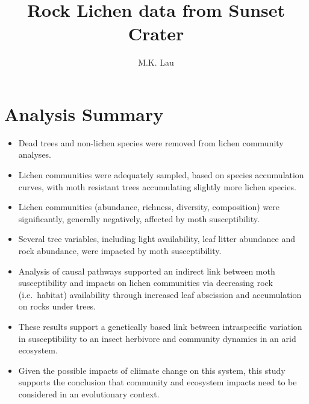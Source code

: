 \documentclass[]{article}
\title{Rock Lichen data from Sunset Crater}
\author{M.K. Lau}
\date{}
\providecommand{\tightlist}{%
  \setlength{\itemsep}{0pt}\setlength{\parskip}{0pt}}
\begin{document}
\maketitle

\section{Analysis Summary}\label{analysis-summary}

\begin{itemize}
\tightlist
\item
  Dead trees and non-lichen species were removed from lichen community
  analyses.
\item
  Lichen communities were adequately sampled, based on species
  accumulation curves, with moth resistant trees accumulating slightly
  more lichen species.
\item
  Lichen communities (abundance, richness, diversity, composition) were
  significantly, generally negatively, affected by moth susceptibility.
\item
  Several tree variables, including light availability, leaf litter
  abundance and rock abundance, were impacted by moth susceptibility.
\item
  Analysis of causal pathways supported an indirect link between moth
  susceptibility and impacts on lichen communities via decreasing rock
  (i.e.~habitat) availability through increased leaf abscission and
  accumulation on rocks under trees.
\item
  These results support a genetically based link between intraspecific
  variation in susceptibility to an insect herbivore and community
  dynamics in an arid ecosystem.
\item
  Given the possible impacts of cliimate change on this system, this
  study supports the conclusion that community and ecosystem impacts
  need to be considered in an evolutionary context.
\end{itemize}
\end{document}
